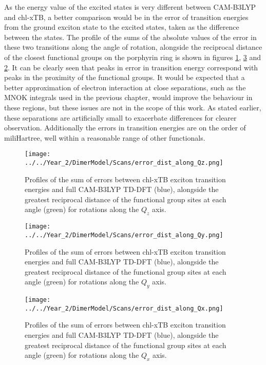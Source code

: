 As the energy value of the excited states is very different between CAM-B3LYP and
chl-xTB, a better comparison would be in the error of transition energies from the
ground exciton state to the excited states, taken as the difference between the 
states. The profile of the sums of the absolute values of the error in these two
transitions along the angle of rotation, alongside the reciprocal distance of the
closest functional groups on the porphyrin ring is shown in figures \ref{fig:error_along_qz}, 
\ref{fig:error_along_qx} and \ref{fig:error_along_qy}. It can be clearly seen that
peaks in error in transition energy correspond with peaks in the proximity of the
functional groups. It would be expected that a better approximation of electron 
interaction at close separations, such as the MNOK integrals used in the previous
chapter, would improve the behaviour in these regions, but these issues are not 
in the scope of this work. As stated earlier, these separations are artificially 
small to exacerbate differences for clearer observation. Additionally the errors 
in transition energies are on the order of miliHartree, well within a reasonable
range of other functionals.

\begin{figure}
    \centering
    \texttt{[image: ../../Year\_2/DimerModel/Scans/error\_dist\_along\_Qz.png]}
    \label{fig:error_along_qz}
    \caption{Profiles of the sum of errors between chl-xTB exciton transition energies
    and full CAM-B3LYP TD-DFT (blue), alongside the greatest reciprocal distance
    of the functional group sites at each angle (green) for rotations along the
    $Q_z$ axis.}
\end{figure}

\begin{figure}
    \centering
    \texttt{[image: ../../Year\_2/DimerModel/Scans/error\_dist\_along\_Qy.png]}
    \label{fig:error_along_qy}
    \caption{Profiles of the sum of errors between chl-xTB exciton transition energies
    and full CAM-B3LYP TD-DFT (blue), alongside the greatest reciprocal distance
    of the functional group sites at each angle (green) for rotations along the
    $Q_y$ axis.}
\end{figure}

\begin{figure}
    \centering
    \texttt{[image: ../../Year\_2/DimerModel/Scans/error\_dist\_along\_Qx.png]}
    \label{fig:error_along_qx}
    \caption{Profiles of the sum of errors between chl-xTB exciton transition energies
    and full CAM-B3LYP TD-DFT (blue), alongside the greatest reciprocal distance
    of the functional group sites at each angle (green) for rotations along the
    $Q_x$ axis.}
\end{figure}

